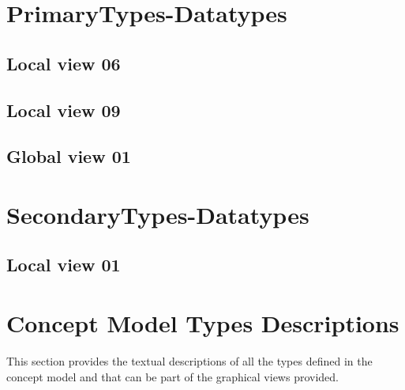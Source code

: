 \section{PrimaryTypes-Datatypes}
\subsection{Local view 06}
\label{sec:lu.uni.lassy.excalibur.examples.icrash-CM-view-local-PrimaryTypes-Datatypes-06}

\subsection{Local view 09}
\label{sec:lu.uni.lassy.excalibur.examples.icrash-CM-view-local-PrimaryTypes-Datatypes-09}


\subsection{Global view 01}
\label{sec:lu.uni.lassy.excalibur.examples.icrash-CM-view-global-PrimaryTypes-Datatypes-01}





\section{SecondaryTypes-Datatypes}
\subsection{Local view 01}
\label{sec:lu.uni.lassy.excalibur.examples.icrash-CM-view-local-SecondaryTypes-Datatypes-01}






\section{Concept Model Types Descriptions}
This section provides the textual descriptions of all the types defined in the concept model and that can be part of the graphical views provided.

